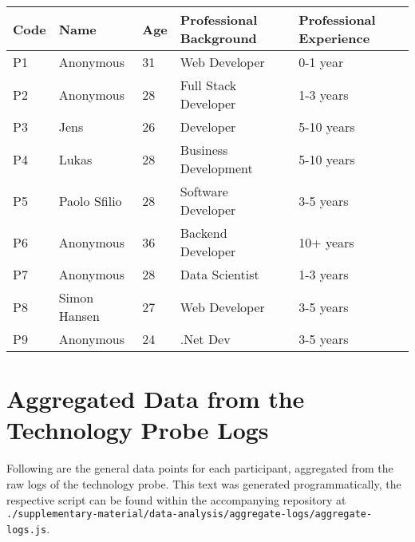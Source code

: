 \begin{appendices}
  \begin{table}[h]
    \begin{tabularx}{\textwidth}{|l|X|l|X|X|}
      \hline
      \textbf{Code} & \textbf{Name} & \textbf{Age} & \textbf{Professional Background} & \textbf{Professional Experience} \\ \hline \hline
      P1            & Anonymous     & 31           & Web Developer                    & 0-1 year                         \\ \hline
      P2            & Anonymous     & 28           & Full Stack Developer             & 1-3 years                        \\ \hline
      P3            & Jens          & 26           & Developer                        & 5-10 years                       \\ \hline
      P4            & Lukas         & 28           & Business Development             & 5-10 years                       \\ \hline
      P5            & Paolo Sfilio  & 28           & Software Developer               & 3-5 years                        \\ \hline
      P6            & Anonymous     & 36           & Backend Developer                & 10+ years                        \\ \hline
      P7            & Anonymous     & 28           & Data Scientist                   & 1-3 years                        \\ \hline
      P8            & Simon Hansen  & 27           & Web Developer                    & 3-5 years                        \\ \hline
      P9            & Anonymous     & 24           & .Net Dev                         & 3-5 years                        \\ \hline
    \end{tabularx}
  \end{table}


  \newpage
  \section{Aggregated Data from the Technology Probe Logs}
  \label{append:log-aggregated}

  Following are the general data points for each participant, aggregated from the raw logs of the technology probe. This text was generated programmatically, the respective script can be found within the accompanying repository at \texttt{./supplementary-material/data-analysis/aggregate-logs/aggregate-logs.js}.


\end{appendices}
